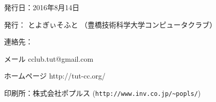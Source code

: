 \thispagestyle{empty}
\begin{flushright}
    \begin{description}
      \item{発行日：}2016年8月14日
      \item{発行：} とよぎぃそふと （豊橋技術科学大学コンピュータクラブ）
      \item{連絡先：} \begin{description} \item{メール} cclub.tut@gmail.com
		      \item{ホームページ} http://tut-cc.org/ \end{description}
      \item{印刷所：}株式会社ポプルス (\verb|http://www.inv.co.jp/~popls/|)
    \end{description}
\end{flushright}
